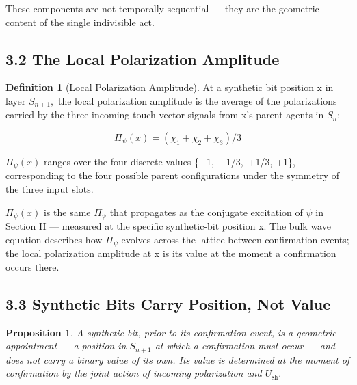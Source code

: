 \documentclass[11pt,oneside]{report}
\newtheorem{proposition}[theorem]{Proposition}
\theoremstyle{definition}
\newtheorem{definition}[theorem]{Definition}
\theoremstyle{remark}
\begin{document}
These components are not temporally sequential --- they are the
geometric content of the single indivisible act.

\subsection*{3.2 The Local Polarization Amplitude}

\begin{definition}[Local Polarization Amplitude]
At a synthetic bit position x
in layer \ensuremath{S_{n+1},} the local polarization amplitude is the average of the
polarizations carried by the three incoming touch vector signals from
x's parent agents in \ensuremath{S_{n}:}
\end{definition}

\begin{equation*}
\Pi_{\psi}(x) = (\chi_{1} + \chi_{2} + \chi_{3}) / 3
\end{equation*}

\ensuremath{\Pi_{\psi}(x)} ranges over the four discrete values \{\ensuremath{-1,} \ensuremath{-1/3,} +1/3, +1\},
corresponding to the four possible parent configurations under the
symmetry of the three input slots.

\ensuremath{\Pi_{\psi}(x)} is the same \ensuremath{\Pi_{\psi}} that propagates as the conjugate excitation of
\ensuremath{\psi} in Section II --- measured at the specific synthetic-bit position x.
The bulk wave equation describes how \ensuremath{\Pi_{\psi}} evolves across the lattice
between confirmation events; the local polarization amplitude at x is
its value at the moment a confirmation occurs there.

\subsection*{3.3 Synthetic Bits Carry Position, Not Value}

\begin{proposition}
A synthetic bit, prior to its confirmation event, is a
geometric appointment --- a position in \ensuremath{S_{n+1}} at which a confirmation
must occur --- and does not carry a binary value of its own. Its value
is determined at the moment of confirmation by the joint action of
incoming polarization and \ensuremath{U_{\mathrm{sh}}.}
\end{proposition}
\end{document}
